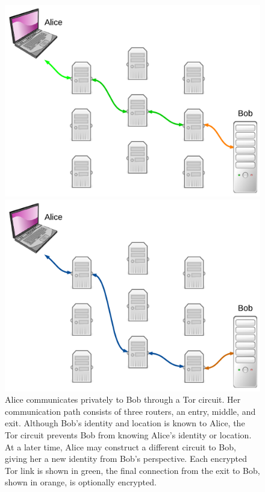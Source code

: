 \begin{figure}[htdp]
	\begin{minipage}[b]{0.48\linewidth}
		\centering
		\includegraphics[width=\textwidth]{images/LucidCharts/Tor_Circuit_Orig.pdf}
	\end{minipage}
	\hspace{0.5cm}
	\begin{minipage}[b]{0.48\linewidth}
		\centering
		\includegraphics[width=\textwidth]{images/LucidCharts/Tor_Circuit_Change.pdf}
	\end{minipage}
	\caption{Alice communicates privately to Bob through a Tor circuit. Her communication path consists of three routers, an entry, middle, and exit. Although Bob's identity and location is known to Alice, the Tor circuit prevents Bob from knowing Alice's identity or location. At a later time, Alice may construct a different circuit to Bob, giving her a new identity from Bob's perspective. Each encrypted Tor link is shown in green, the final connection from the exit to Bob, shown in orange, is optionally encrypted.}
	\label{fig:torOverview}
\end{figure}

